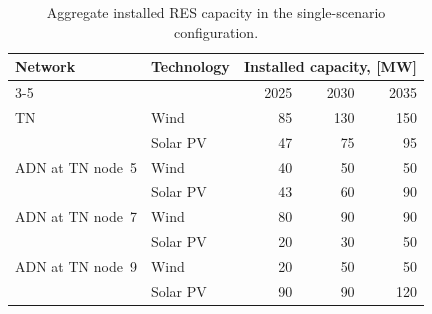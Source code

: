 \documentclass[preprint,12pt]{elsarticle}
\providecommand{\DIFaddbegin}{} %
\providecommand{\DIFaddend}{} %
\providecommand{\DIFdelbegin}{} %
\providecommand{\DIFdelend}{} %
\begin{document}
\DIFdelbegin %
\DIFdelend \DIFaddbegin \begin{table}[htbp!]
    \centering
    \caption{Aggregate installed RES capacity in the
    single-scenario configuration.}
    \label{tab:res_capacity_summary}
    \begin{tabular}{@{}llrrr@{}}
        \toprule
        Network & Technology & \multicolumn{3}{c}{Installed capacity, [MW]} \\
        \cmidrule(lr){3-5}
        & & 2025 & 2030 & 2035 \\
        \midrule
        TN & Wind     & 85 & 130 & 150 \\
           & Solar PV & 47 & 75  & 95  \\
        \midrule
        ADN at TN node~5 & Wind     & 40 & 50 & 50 \\
                         & Solar PV & 43 & 60 & 90 \\
        \midrule
        ADN at TN node~7 & Wind     & 80 & 90 & 90 \\
                         & Solar PV & 20 & 30 & 50 \\
        \midrule
        ADN at TN node~9 & Wind     & 20 & 50 & 50  \\
                         & Solar PV & 90 & 90 & 120 \\
        \bottomrule
    \end{tabular}
\end{table}
\DIFaddend 
\end{document}
